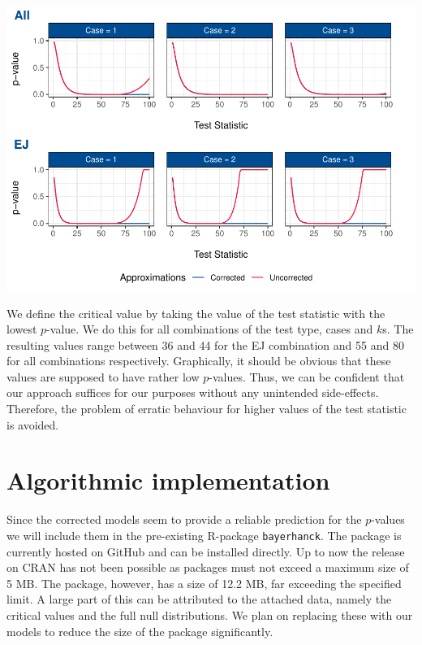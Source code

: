 \documentclass[12pt,a4paper]{article}
\let\origfigure\figure
\let\endorigfigure\endfigure
\renewenvironment{figure}[1][2] {
    \expandafter\origfigure\expandafter[H]
} {
    \endorigfigure
}
\begin{document}
\begin{figure}
\centering
\includegraphics{p_approx_paper_files/figure-latex/p_stat__k.2-1.pdf}
\caption{\label{fig:e_j_k.1} Simulted \(p\)-values plotted against
\(p\)-values approximated by final corrected models, exemplary for
\(k = 1\).Corrected (blue) and uncorrected (red) \(p\)-value predictions
for all cases and \(k = 2\), using EJ and all as underlying tests.}
\end{figure}

We define the critical value by taking the value of the test statistic
with the lowest \(p\)-value. We do this for all combinations of the test
type, cases and \(k\)s. The resulting values range between 36 and 44 for
the EJ combination and 55 and 80 for all combinations respectively.
Graphically, it should be obvious that these values are supposed to have
rather low \(p\)-values. Thus, we can be confident that our approach
suffices for our purposes without any unintended side-effects.
Therefore, the problem of erratic behaviour for higher values of the
test statistic is avoided.

\hypertarget{algorithmic-implementation}{%
\section{Algorithmic implementation}\label{algorithmic-implementation}}

Since the corrected models seem to provide a reliable prediction for the
\(p\)-values we will include them in the pre-existing R-package
\texttt{bayerhanck}. The package is currently hosted on GitHub and can
be installed directly. Up to now the release on \ac{CRAN} has not been
possible as packages must not exceed a maximum size of 5 MB. The
package, however, has a size of 12.2 MB, far exceeding the specified
limit. A large part of this can be attributed to the attached data,
namely the critical values and the full null distributions. We plan on
replacing these with our models to reduce the size of the package
significantly.
\end{document}
